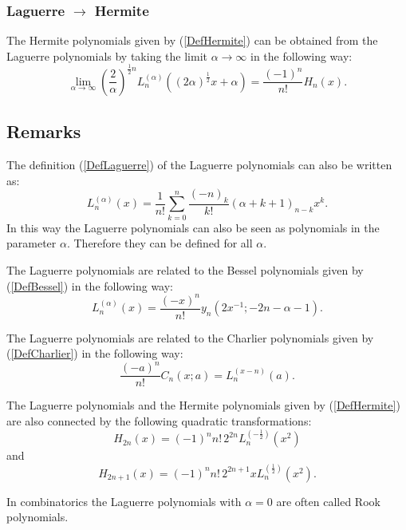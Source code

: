 \documentclass[envcountchap,graybox]{svmono}
\newcounter{rom}
\begin{document}
\subsubsection*{Laguerre $\rightarrow$ Hermite}
The Hermite polynomials given by (\ref{DefHermite}) can be obtained from the Laguerre
polynomials by taking the limit $\alpha\rightarrow\infty$ in the following way:
\begin{equation}
\lim_{\alpha\rightarrow\infty}
\left(\frac{2}{\alpha}\right)^{\frac{1}{2}n}
L_n^{(\alpha)}((2\alpha)^{\frac{1}{2}}x+\alpha)=\frac{(-1)^n}{n!}H_n(x).
\end{equation}

\subsection*{Remarks}
The definition (\ref{DefLaguerre}) of the Laguerre polynomials can also be
written as:
$$L_n^{(\alpha)}(x)=\frac{1}{n!}\sum_{k=0}^n\frac{(-n)_k}{k!}(\alpha+k+1)_{n-k}x^k.$$
In this way the Laguerre polynomials can also be seen as polynomials in the parameter $\alpha$.
Therefore they can be defined for all $\alpha$.

\noindent
The Laguerre polynomials are related to the Bessel polynomials given by (\ref{DefBessel})
in the following way:
$$L_n^{(\alpha)}(x)=\frac{(-x)^n}{n!}y_n(2x^{-1};-2n-\alpha-1).$$

\noindent
The Laguerre polynomials are related to the Charlier polynomials given by (\ref{DefCharlier})
in the following way:
$$\frac{(-a)^n}{n!}C_n(x;a)=L_n^{(x-n)}(a).$$

\noindent
The Laguerre polynomials and the Hermite polynomials given by (\ref{DefHermite}) are also
connected by the following quadratic transformations:
$$H_{2n}(x)=(-1)^nn!\,2^{2n}L_n^{(-\frac{1}{2})}(x^2)$$
and
$$H_{2n+1}(x)=(-1)^nn!\,2^{2n+1}xL_n^{(\frac{1}{2})}(x^2).$$

\noindent
In combinatorics the Laguerre polynomials with $\alpha=0$ are often called Rook
polynomials.
\end{document}
